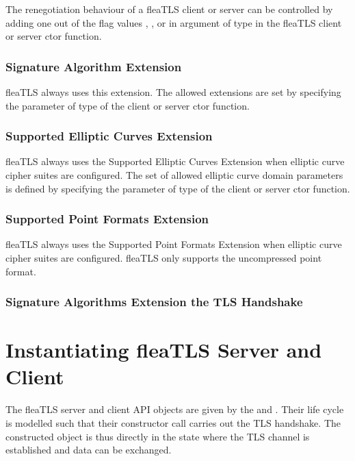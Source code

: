 \documentclass[a4paper,11pt]{scrartcl}
\begin{document}
The renegotiation behaviour of a fleaTLS client or server can be controlled by
adding one out of the flag values 
, 
, or 
in argument of type  in the
fleaTLS client or server ctor function. 

\subsubsection{Signature Algorithm Extension}
fleaTLS always uses this extension. The allowed extensions are set by specifying
the parameter of type  of the client or server ctor
function.

\subsubsection{Supported Elliptic Curves Extension}
fleaTLS always uses the Supported Elliptic Curves Extension when elliptic curve
cipher suites are configured. The set of allowed elliptic curve domain
parameters is defined by
specifying the parameter of type  of the client or
server ctor function.

\subsubsection{Supported Point Formats Extension}
fleaTLS always uses the Supported Point Formats Extension when elliptic curve
cipher suites are configured. fleaTLS only supports the uncompressed point
format.

\subsubsection{Signature Algorithms Extension the TLS Handshake}


\section{Instantiating fleaTLS Server and Client}

The fleaTLS server and client API objects are given by the
\serverCtx and \clientCtx. Their life cycle is modelled such that their
constructor call carries out the TLS handshake. The constructed object is thus
directly in the state where the TLS channel is established and data can be
exchanged.
\end{document}
